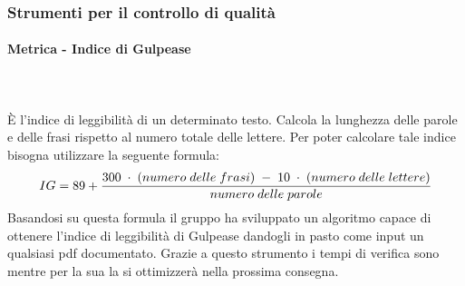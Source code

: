 \subsubsection{Strumenti per il controllo di qualità}
\paragraph{Metrica - Indice di Gulpease}\mbox{}\\ \\
È l'indice di leggibilità di un determinato testo. Calcola la lunghezza delle parole e delle frasi rispetto al numero totale delle lettere. Per poter calcolare tale indice bisogna utilizzare la seguente formula:
$$IG = 89 + {{300 \; \cdot \; (numero\; delle \; frasi) \; - \; 10 \; \cdot \; (numero \; delle \; lettere)}\over numero \; delle \; parole}$$
Basandosi su questa formula il gruppo \Gruppo ha sviluppato un algoritmo capace di ottenere l'indice di leggibilità di Gulpease dandogli in pasto come input un qualsiasi pdf 
documentato. Grazie a questo strumento i tempi di verifica sono  mentre per la sua  la si ottimizzerà nella prossima consegna.